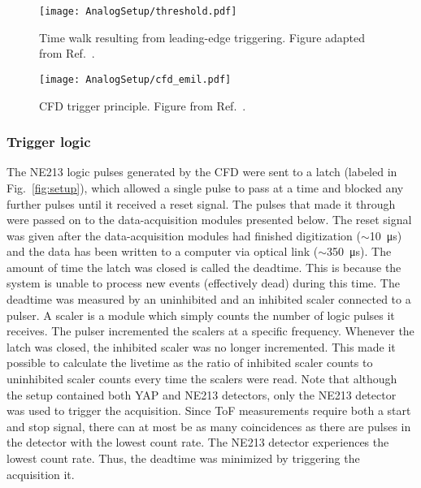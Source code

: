 \documentclass[main.tex]{subfiles}
\begin{document}
\begin{figure}[h]
    \centering
        \texttt{[image: AnalogSetup/threshold.pdf]}
        \caption[Time walk resulting from leading edge triggering.]{Time walk resulting from leading-edge triggering. Figure adapted from Ref.~\cite{Rofors}.}
    \label{fig:discriminator}
\end{figure}

\begin{figure}[h]
    \centering
        \texttt{[image: AnalogSetup/cfd\_emil.pdf]}
        \caption[CFD trigger principle.]{CFD trigger principle. Figure from Ref.~\cite{Rofors}.}
    \label{fig:cfd}
\end{figure}



\subsubsection{Trigger logic}
The NE213 logic pulses generated by the CFD were sent to a latch (labeled  in Fig.~\ref{fig:setup}), which allowed a single pulse to pass at a time and blocked any further pulses until it received a reset signal. The pulses that made it through were passed on to the data-acquisition modules presented below. The reset signal was given after the data-acquisition modules had finished digitization ($\sim$\SI{10}{\micro s}) and the data has been written to a computer via optical link ($\sim$\SI{350}{\micro s}). The amount of time the latch was closed is called the deadtime. This is because the system is unable to process new events (effectively dead) during this time. The deadtime was measured by an uninhibited and an inhibited scaler connected to a pulser. A scaler is a module which simply counts the number of logic pulses it receives. The pulser incremented the scalers at a specific frequency. Whenever the latch was closed, the inhibited scaler was no longer incremented. This made it possible to calculate the livetime as the ratio of inhibited scaler counts to uninhibited scaler counts every time the scalers were read. Note that although the setup contained both YAP and NE213 detectors, only the NE213 detector was used to trigger the acquisition. Since ToF measurements require both a start and stop signal, there can at most be as many coincidences as there are pulses in the detector with the lowest count rate. The NE213 detector experiences the lowest count rate. Thus, the deadtime was minimized by triggering the acquisition it.
\end{document}
